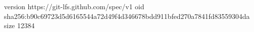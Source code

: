 version https://git-lfs.github.com/spec/v1
oid sha256:b90c69723d5d6165544a72d49f4d346678bdd911bfed270a7841fd83559304da
size 12384
